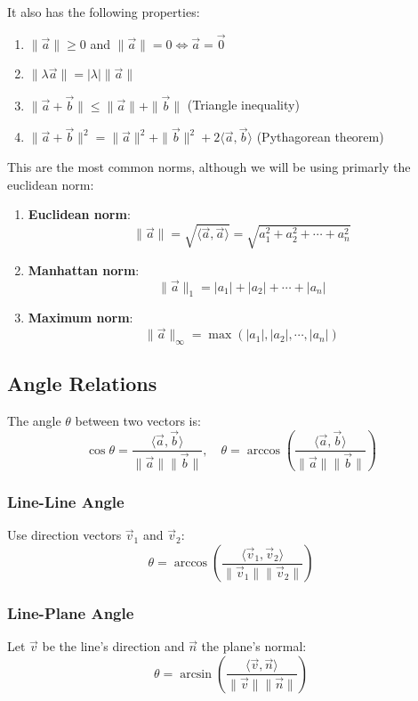 It also has the following properties:

\begin{enumerate}[label=(\roman*)]
	\item $\|\vec{a}\| \geq 0$ and $\|\vec{a}\| = 0 \Leftrightarrow \vec{a} = \vec{0}$
	\item $\|\lambda \vec{a}\| = |\lambda| \|\vec{a}\|$
	\item $\|\vec{a} + \vec{b}\| \leq \|\vec{a}\| + \|\vec{b}\|$ (Triangle inequality)
	\item $\|\vec{a} + \vec{b}\|^2 = \|\vec{a}\|^2 + \|\vec{b}\|^2 + 2\langle\vec{a}, \vec{b}\rangle$ (Pythagorean theorem)
\end{enumerate}

This are the most common norms, although we will be using primarly the euclidean norm:

\begin{enumerate}
	\item \textbf{Euclidean norm}:
	      \[
		      \|\vec{a}\| = \sqrt{\langle\vec{a}, \vec{a}\rangle} = \sqrt{a_1^2 + a_2^2 + \cdots + a_n^2}
	      \]
	\item \textbf{Manhattan norm}:
	      \[
		      \|\vec{a}\|_1 = |a_1| + |a_2| + \cdots + |a_n|
	      \]
	\item \textbf{Maximum norm}:
	      \[
		      \|\vec{a}\|_\infty = \max(|a_1|, |a_2|, \cdots , |a_n|)
	      \]
\end{enumerate}

\subsection{Angle Relations}
The angle $\theta$ between two vectors is:
\[
	\cos\theta = \frac{\langle\vec{a}, \vec{b}\rangle}{\|\vec{a}\|\|\vec{b}\|}, \quad \theta = \arccos\left( \frac{\langle\vec{a}, \vec{b}\rangle}{\|\vec{a}\|\|\vec{b}\|} \right)
\]

\subsubsection*{Line-Line Angle}
Use direction vectors $\vec{v}_1$ and $\vec{v}_2$:
\[
	\theta = \arccos\left( \frac{\langle\vec{v}_1, \vec{v}_2\rangle}{\|\vec{v}_1\|\|\vec{v}_2\|} \right)
\]

\subsubsection*{Line-Plane Angle}
Let $\vec{v}$ be the line's direction and $\vec{n}$ the plane's normal:
\[
	\theta = \arcsin\left( \frac{\langle\vec{v}, \vec{n}\rangle}{\|\vec{v}\|\|\vec{n}\|} \right)
\]

